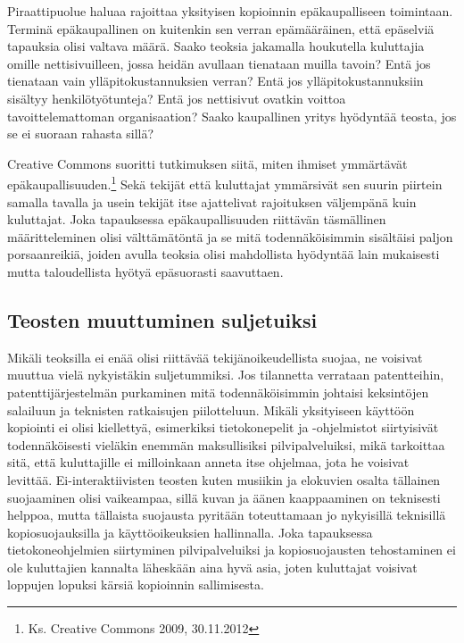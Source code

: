 \documentclass[titlepage,12pt]{article}
\begin{document}
Piraattipuolue haluaa rajoittaa yksityisen kopioinnin epäkaupalliseen
toimintaan.  Terminä epäkaupallinen on kuitenkin sen verran
epämääräinen, että epäselviä tapauksia olisi valtava määrä.  Saako
teoksia jakamalla houkutella kuluttajia omille nettisivuilleen, jossa
heidän avullaan tienataan muilla tavoin? Entä jos tienataan vain
ylläpitokustannuksien verran?  Entä jos ylläpitokustannuksiin sisältyy
henkilötyötunteja?  Entä jos nettisivut ovatkin voittoa
tavoittelemattoman organisaation?  Saako kaupallinen yritys hyödyntää
teosta, jos se ei suoraan rahasta sillä?

Creative Commons suoritti tutkimuksen siitä, miten ihmiset ymmärtävät
epäkaupallisuuden.\footnote{Ks. Creative Commons 2009, 30.11.2012}
Sekä tekijät että kuluttajat ymmärsivät sen suurin piirtein samalla
tavalla ja usein tekijät itse ajattelivat rajoituksen väljempänä kuin
kuluttajat.  Joka tapauksessa epäkaupallisuuden riittävän täsmällinen
määritteleminen olisi välttämätöntä ja se mitä todennäköisimmin
sisältäisi paljon porsaanreikiä, joiden avulla teoksia olisi
mahdollista hyödyntää lain mukaisesti mutta taloudellista hyötyä
epäsuorasti saavuttaen.






\subsection{Teosten muuttuminen suljetuiksi}

Mikäli teoksilla ei enää olisi riittävää tekijänoikeudellista suojaa,
ne voisivat muuttua vielä nykyistäkin suljetummiksi.  Jos tilannetta
verrataan patentteihin, patenttijärjestelmän purkaminen mitä
todennäköisimmin johtaisi keksintöjen salailuun ja teknisten
ratkaisujen piilotteluun.  Mikäli yksityiseen käyttöön kopiointi ei
olisi kiellettyä, esimerkiksi tietokonepelit ja -ohjelmistot
siirtyisivät todennäköisesti vieläkin enemmän maksullisiksi
pilvipalveluiksi, mikä tarkoittaa sitä, että kuluttajille ei
milloinkaan anneta itse ohjelmaa, jota he voisivat levittää.
Ei-interaktiivisten teosten kuten musiikin ja elokuvien osalta
tällainen suojaaminen olisi vaikeampaa, sillä kuvan ja äänen
kaappaaminen on teknisesti helppoa, mutta tällaista suojausta pyritään
toteuttamaan jo nykyisillä teknisillä kopiosuojauksilla ja
käyttöoikeuksien hallinnalla.  Joka tapauksessa tietokoneohjelmien
siirtyminen pilvipalveluiksi ja kopiosuojausten tehostaminen ei ole
kuluttajien kannalta läheskään aina hyvä asia, joten kuluttajat
voisivat loppujen lopuksi kärsiä kopioinnin sallimisesta.
\end{document}
